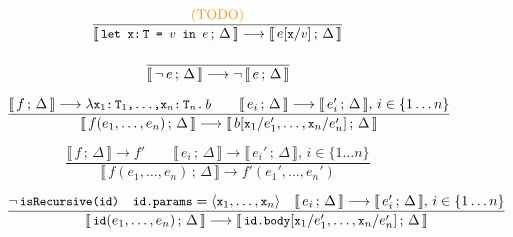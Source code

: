 \documentclass[a4paper,twoside]{article}
\newcommand{\lb}[2]{\llbracket\, #1\,;\, #2\, \rrbracket}
\newcommand{\TODO}[1]{\textcolor{YellowOrange}{(TODO)}} %
\newcommand{\stt}[1]{\texttt{\small{#1}}}
\begin{document}

\begin{figure}[htb]\ContinuedFloat
\centering
\begin{framed}

\begin{equation}
\dfrac{
  \text{\TODO{This is overly simplistic}}
}{
  \lb{\stt{let x:\,T = $v$ in $e$}}{\Delta} \longrightarrow
  \lb{e[\stt{x}/\stt{$v$}]}{\Delta}
}
\end{equation}



\begin{equation}
\dfrac{
  \empty
}{
  \lb{\neg\, e}{\Delta} \longrightarrow \neg\,\lb{e}{\Delta}
}
\end{equation}

\begin{equation}
\dfrac{
  \lb{f}{\Delta} \longrightarrow \lambda \stt{x$_1$:\,T$_1$,\ldots,x$_n$:\,T$_n$.\,$b$}
  \qquad
  \lb{e_i}{\Delta} \longrightarrow \lb{e_i'}{\Delta},\, i \in \{1 \ldots n\}
}{
  \lb{f(e_1,\ldots,e_n)}{\Delta} \longrightarrow
  \lb{b[\stt{x}_1/e_1',\ldots,\stt{x}_n/e_n']}{\Delta}
}
\end{equation}

\begin{equation}
\dfrac{
  \lb{f}{\Delta} \longrightarrow f' \qquad
  \lb{e_i}{\Delta} \longrightarrow \lb{e_i'}{\Delta},\, i \in \{1 \ldots n\}
}{
  \lb{f(e_1,\ldots,e_n)}{\Delta} \longrightarrow
  f'(e_1', \ldots, e_n')
}
\end{equation}


\begin{equation}
\dfrac{
 \neg\,\stt{isRecursive(id)} \quad
 \stt{id.params} = \langle \stt{x}_1, \ldots, \stt{x}_n \rangle \quad
 \lb{e_i}{\Delta} \longrightarrow \lb{e_i'}{\Delta},\, i \in \{1 \ldots n\}
}{
  \lb{\stt{id}(e_1,\ldots,e_n)}{\Delta} \longrightarrow
  \lb{\stt{id.body}[\stt{x}_1/e_1',\ldots,\stt{x}_n/e_n']}{\Delta}
}
\label{fig:symbolicsem:fi1}
\end{equation}


\end{framed}
\end{figure}
\end{document}
